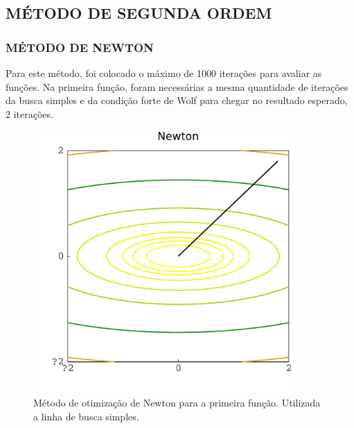 \documentclass[12pt]{article}
\begin{document}
\subsection{MÉTODO DE SEGUNDA ORDEM}
\subsubsection{MÉTODO DE NEWTON} 
Para este método, foi colocado o máximo de 1000 iterações para avaliar as funções. Na primeira função, foram necessárias a mesma quantidade de iterações da busca simples e da condição forte de Wolf para chegar no resultado esperado, 2 iterações.
\begin{figure}[ht!]
	\centering
	\includegraphics[width=10cm]{Figuras/Newton_linef2}
	\caption{Método de otimização de Newton para a primeira função. Utilizada a linha de busca simples.} 
	\label{fig:new1}
\end{figure} 
\end{document}
